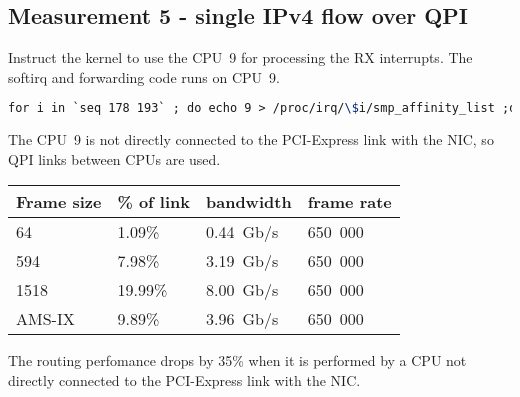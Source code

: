 
\subsection{Measurement 5 - single IPv4 flow over QPI}
Instruct the kernel to use the CPU~9 for processing the RX interrupts.
The softirq and forwarding code runs on CPU~9.
\begin{lstlisting}[language=TeX]
for i in `seq 178 193` ; do echo 9 > /proc/irq/\$i/smp_affinity_list ;done
\end{lstlisting}
The CPU~9 is not directly connected to the PCI-Express link with the NIC,
so QPI links between CPUs are used.

\begin{tabular}{ | l | l | l | l | }
\hline
Frame size & \% of link & bandwidth & frame rate \\
\hline
64     &  1.09\% &  0.44~Gb/s & 650~000 \\
594    &  7.98\% &  3.19~Gb/s & 650~000 \\
1518   & 19.99\% &  8.00~Gb/s & 650~000 \\
AMS-IX &  9.89\% &  3.96~Gb/s & 650~000 \\
\hline
\end{tabular}
The routing perfomance drops by 35\% when it is performed by
a CPU not directly connected to the PCI-Express link with the NIC.

